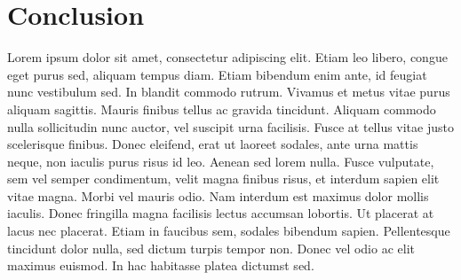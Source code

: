 \section{Conclusion}
Lorem ipsum dolor sit amet, consectetur adipiscing elit. Etiam leo libero, congue eget purus sed, aliquam tempus diam. Etiam bibendum enim ante, id feugiat nunc vestibulum sed. In blandit commodo rutrum. Vivamus et metus vitae purus aliquam sagittis. Mauris finibus tellus ac gravida tincidunt. Aliquam commodo nulla sollicitudin nunc auctor, vel suscipit urna facilisis. Fusce at tellus vitae justo scelerisque finibus. Donec eleifend, erat ut laoreet sodales, ante urna mattis neque, non iaculis purus risus id leo. Aenean sed lorem nulla. Fusce vulputate, sem vel semper condimentum, velit magna finibus risus, et interdum sapien elit vitae magna. Morbi vel mauris odio. Nam interdum est maximus dolor mollis iaculis. Donec fringilla magna facilisis lectus accumsan lobortis. Ut placerat at lacus nec placerat. Etiam in faucibus sem, sodales bibendum sapien. Pellentesque tincidunt dolor nulla, sed dictum turpis tempor non. Donec vel odio ac elit maximus euismod. In hac habitasse platea dictumst sed.
